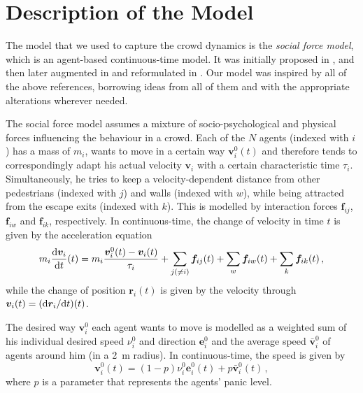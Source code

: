 \section{Description of the Model} \label{sec:4-model}
The model that we used to capture the crowd dynamics is the \emph{social force model}, which is an agent-based continuous-time model. It was initially proposed in \cite{Helbing2000}, and then later augmented in \cite{Zainuddin2010} and reformulated in \cite{Wang2016}. Our model was inspired by all of the above references, borrowing ideas from all of them and with the appropriate alterations wherever needed. 

The social force model assumes a mixture of socio-psychological and physical forces influencing the behaviour in a crowd. Each of the $N$ agents (indexed with $i$) has a mass of $m_i$, wants to move in a certain way $\bm{v}_i^0(t)$ and therefore tends to correspondingly adapt his actual velocity $\bm{v}_i$ with a certain characteristic time $\tau_i$. Simultaneously, he tries to keep a velocity-dependent distance from other pedestrians (indexed with $j$) and walls (indexed with $w$), while being attracted from the escape exits (indexed with $k$). This is modelled by interaction forces $\bm{f}_{ij}$, $\bm{f}_{iw}$ and $\bm{f}_{ik}$, respectively. In continuous-time, the change of velocity in time $t$ is given by the acceleration equation
\begin{equation} \label{eq:acceleration}
	m_i \frac{\mathrm{d}\bm{v}_i}{\mathrm{d} t}(t) = m_i \frac{\bm{v}_i^0(t) -\bm{v}_i(t)}{\tau_i} + \sum_{j(\neq i)}^{}\bm{f}_{ij}(t) + \sum_{w}^{}\bm{f}_{iw}(t) + \sum_{k}^{}\bm{f}_{ik}(t) \,,
\end{equation}
while the change of position $\bm{r}_i(t)$ is given by the velocity through $\bm{v}_i(t) = (\mathrm{d}\bm{r}_i / \mathrm{d} t) (t)$.

The desired way $\bm{v}_i^0$ each agent wants to move is modelled as a weighted sum of his individual desired speed $\nu_i^0$ and direction $\bm{e}_i^0$ and the average speed $\bar{\bm{v}}_i^0$ of agents around him (in a \SI{2}{\meter} radius). In continuous-time, the speed is given by
\begin{equation} \label{eq:vi}
	\bm{v}_i^0(t) = (1-p) \nu_i^0 \bm{e}_i^0(t) + p \bar{\bm{v}}_i^0(t) \,,
\end{equation}
where $p$ is a parameter that represents the agents' panic level.

